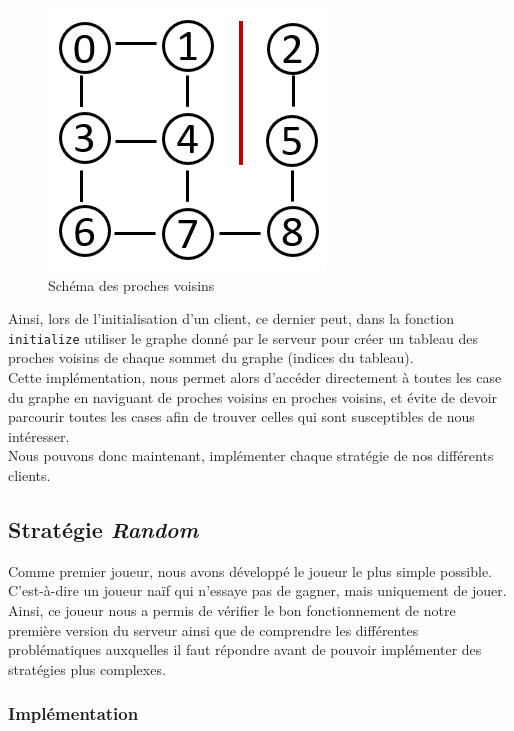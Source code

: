 \documentclass[11pt]{article}
\begin{document}
\begin{figure}[H]
    \centering
    \includegraphics[scale = 0.5]{proches_voisins.png}
    \caption{Schéma des proches voisins}
    \label{fig:proches_voisins}
\end{figure}

Ainsi, lors de l'initialisation d'un client, ce dernier peut, dans la fonction \texttt{initialize} utiliser le graphe donné par le serveur pour créer un tableau des proches voisins de chaque sommet du graphe (indices du tableau). \\
Cette implémentation, nous permet alors d'accéder directement à toutes les case du graphe en naviguant de proches voisins en proches voisins, et évite de devoir parcourir toutes les cases afin de trouver celles qui sont susceptibles de nous intéresser. \\

Nous pouvons donc maintenant, implémenter chaque stratégie de nos différents clients.

\subsection{Stratégie \textit{Random}}

Comme premier joueur, nous avons développé le joueur le plus simple possible. C'est-à-dire un joueur naïf qui n'essaye pas de gagner, mais uniquement de jouer. Ainsi, ce joueur nous a permis de vérifier le bon fonctionnement de notre première version du serveur ainsi que de comprendre les différentes problématiques auxquelles il faut répondre avant de pouvoir implémenter des stratégies plus complexes.

\subsubsection{Implémentation}
\end{document}
